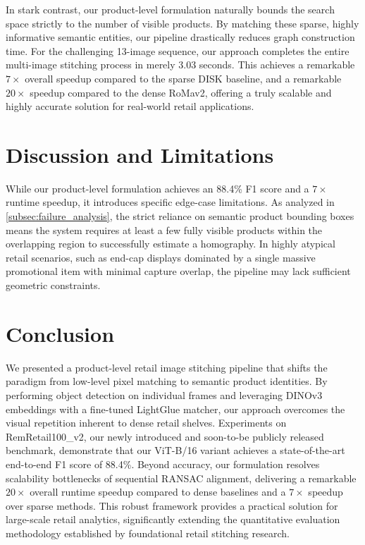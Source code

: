 \documentclass[10pt,twocolumn,letterpaper]{article}
\begin{document}
In stark contrast, our product-level formulation naturally bounds the search space strictly to the number of visible products. By matching these sparse, highly informative semantic entities, our pipeline drastically reduces graph construction time. For the challenging 13-image sequence, our approach completes the entire multi-image stitching process in merely 3.03 seconds. This achieves a remarkable $7\times$ overall speedup compared to the sparse DISK baseline, and a remarkable $20\times$ speedup compared to the dense RoMav2, offering a truly scalable and highly accurate solution for real-world retail applications.



\section{Discussion and Limitations}
\label{sec:discussion}

While our product-level formulation achieves an 88.4\% F1 score and a $7\times$ runtime speedup, it introduces specific edge-case limitations. As analyzed in \cref{subsec:failure_analysis}, the strict reliance on semantic product bounding boxes means the system requires at least a few fully visible products within the overlapping region to successfully estimate a homography. In highly atypical retail scenarios, such as end-cap displays dominated by a single massive promotional item with minimal capture overlap, the pipeline may lack sufficient geometric constraints. 

\section{Conclusion}
We presented a product-level retail image stitching pipeline that shifts the paradigm from low-level pixel matching to semantic product identities. By performing object detection on individual frames and leveraging DINOv3 embeddings with a fine-tuned LightGlue matcher, our approach overcomes the visual repetition inherent to dense retail shelves.  Experiments on RemRetail100\_v2, our newly introduced and soon-to-be publicly released benchmark, demonstrate that our ViT-B/16 variant achieves a state-of-the-art end-to-end F1 score of 88.4\%. Beyond accuracy, our formulation resolves scalability bottlenecks of sequential RANSAC alignment, delivering a remarkable $20\times$ overall runtime speedup compared to dense baselines and a $7\times$ speedup over sparse methods. This robust framework provides a practical solution for large-scale retail analytics, significantly extending the quantitative evaluation methodology established by foundational retail stitching research.

{
    \small
    
    
}

% 
\end{document}
